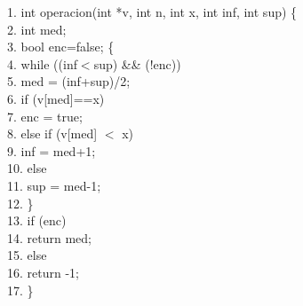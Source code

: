 \documentclass[titlepage, 12pt,a4paper]{article}
\begin{document}
	\hspace*{1cm}1. int operacion(int *v, int n, int x, int inf, int sup) \{ \\
	\hspace*{1cm}2.\hspace*{2em}	int med;\\
	\hspace*{1cm}3.\hspace*{2em}	bool enc=false; \{ \\
	\hspace*{1cm}4.\hspace*{2em}	while ((inf$<$sup) \&\& (!enc)) \\
	\hspace*{1cm}5.\hspace*{4em}		med = (inf+sup)/2; \\
	\hspace*{1cm}6.\hspace*{4em}		if (v[med]==x) \\
	\hspace*{1cm}7.\hspace*{6em}			enc = true;\\
	\hspace*{1cm}8.\hspace*{4em}		else if (v[med] $<$ x) \\
	\hspace*{1cm}9.\hspace*{6em}			inf = med+1;\\
	\hspace*{1cm}10.\hspace*{4em}		else \\
	\hspace*{1cm}11.\hspace*{6em}			sup = med-1; \\
	\hspace*{1cm}12.\hspace*{2em}	\}\\
  	\hspace*{1cm}13.\hspace*{2em}	if (enc) \\
  	\hspace*{1cm}14.\hspace*{4em}		return med; \\
	\hspace*{1cm}15.\hspace*{2em}	else \\
	\hspace*{1cm}16.\hspace*{4em}		return -1; \\
	\hspace*{1cm}17. \} \\
	
\end{document}
